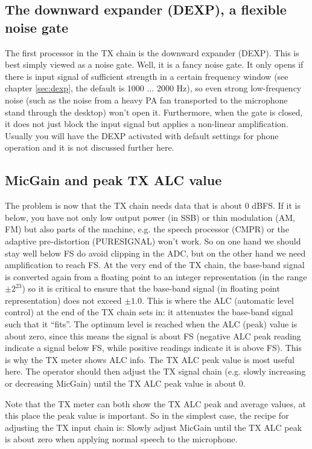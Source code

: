 \documentclass[12pt]{book}
\begin{document}
\subsection{The downward expander (DEXP), a flexible noise gate}

The first processor in the TX chain is the downward expander (DEXP). This is best simply viewed as
a noise gate. Well, it is a fancy noise gate. It only opens if there is input signal of sufficient
strength in a certain frequency window (see chapter \ref{sec:dexp}, the default is 1000 $\ldots$ 2000 Hz),
so even strong low-frequency noise (such as the noise from a heavy PA fan transported to the microphone stand
through the desktop) won't open it. Furthermore, when the gate is closed, it does not just block the input
signal but applies a non-linear amplification. Usually you will have the DEXP activated with default
settings for phone operation and it is not discussed further here.

\subsection{MicGain and peak TX ALC value}

The problem is now that the TX chain needs data that is about 0 dBFS. If it is below, you have not only
low output power (in SSB) or thin modulation (AM, FM) but also parts of the machine, e.g. the speech
processor (CMPR) or the adaptive pre-distortion (PURESIGNAL) won't work.
So on one hand we should stay
well below FS do avoid clipping in the ADC, but on the other hand we need amplification to reach FS.
At the very end of the TX chain, the base-band signal is converted again from a floating point
to an integer representation (in the range $\pm 2^{23}$) so it is critical to ensure that the base-band
signal (in floating point representation) does not exceed $\pm 1.0$. This is where the ALC (automatic
level control) at the end of the TX chain sets in: it attenuates the base-band signal such that it
``fits''. The optimum level is reached when the ALC (peak) value is about zero, since this means
the signal is about FS (negative ALC peak reading indicate a signal below FS, while positive readings
indicate it is above FS).
This is why the TX meter shows ALC info. The TX ALC peak value is most useful here.  The operator should then adjust
the TX signal chain (e.g. slowly increasing or decreasing  MicGain) until the TX ALC peak value is about 0.

Note that the TX meter can both show the TX ALC peak and average values, at this place the peak value
is important. So in the simplest case, the recipe for adjusting the TX input chain is:
{\color{red} Slowly adjust MicGain until the TX ALC peak is about zero when applying normal speech to the
microphone.}
\end{document}
